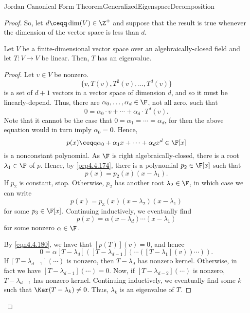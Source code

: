 \begin{thm}{Jordan Canonical Form Theorem}{GeneralizedEigenspaceDecomposition}
\begin{proof}
		So, let $d\ceqq \dim (V)\in \Z ^+$ and suppose that the result is true whenever the dimension of the vector space is less than $d$.
		\begin{lma}[break at=19cm/0pt]{}{}
			Let $V$ be a finite-dimensional vector space over an algebraically-closed field and let $T\colon V\rightarrow V$ be linear.  Then, $T$ has an eigenvalue.
			\begin{proof}
				Let $v\in V$ be nonzero.
				\begin{equation}
				\{ v,T(v),T^2(v),\ldots ,T^d(v)\}
				\end{equation}
				is a set of $d+1$ vectors in a vector space of dimension $d$, and so it must be linearly-depend.  Thus, there are $\alpha _0,\ldots ,\alpha _d\in \F$, not all zero, such that
				\begin{equation}\label{eqn4.4.180}
				0=\alpha _0\cdot v+\cdots +\alpha _d\cdot T^d(v).
				\end{equation}
				Note that it cannot be the case that $0=\alpha _1=\cdots =\alpha _d$, for then the above equation would in turn imply $\alpha _0=0$.  Hence,
				\begin{equation}
					p(x)\ceqq \alpha _0+\alpha _1x+\cdots +\alpha _dx^d\in \F [x]
				\end{equation}
				is a nonconstant polynomial.  As $\F$ is right algebraically-closed, there is a root $\lambda _1\in \F$ of $p$.  Hence, by \cref{prp4.4.174}, there is a polynomial $p_2\in \F [x]$ such that
				\begin{equation}
					p(x)=p_2(x)(x-\lambda _1).
				\end{equation}
				If $p_2$ is constant, stop.  Otherwise, $p_2$ has another root $\lambda _2\in \F$, in which case we can write
				\begin{equation}
					p(x)=p_3(x)(x-\lambda _2)(x-\lambda _1)
				\end{equation}
				for some $p_3\in \F [x]$.  Continuing inductively, we eventually find
				\begin{equation}
					p(x)=\alpha (x-\lambda _d)\cdots (x-\lambda _1)
				\end{equation}
				for some nonzero $\alpha \in \F$.
				
				By \eqref{eqn4.4.180}, we have that $[p(T)](v)=0$, and hence
				\begin{equation}
					0=\alpha [T-\lambda _d]\left( [T-\lambda _{d-1}]\left( \cdots ([T-\lambda _1](v))\cdots \right) \right) .
				\end{equation}
				If $[T-\lambda _{d-1}](\cdots )$ is nonzero, then $T-\lambda _d$ has nonzero kernel.  Otherwise, in fact we have $[T-\lambda _{d-1}](\cdots )=0$.  Now, if $[T-\lambda _{d-2}](\cdots )$ is nonzero, $T-\lambda _{d-1}$ has nonzero kernel.  Continuing inductively, we eventually find some $k$ such that $\Ker (T-\lambda _k)\neq 0$.  Thus, $\lambda _k$ is an eigenvalue of $T$.
			\end{proof}
		\end{lma}
	

\end{proof}
\end{thm}
